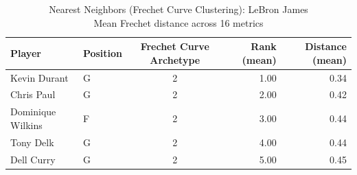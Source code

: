 \begin{table}[t]
\caption*{
{\fontsize{20}{25} Nearest Neighbors (Frechet Curve Clustering): LeBron James\fontsize{12}{15}\selectfont } \\ 
{\fontsize{14}{17}\selectfont  Mean Frechet distance across 16 metrics\fontsize{12}{15}\selectfont }
} 
\fontsize{12.0pt}{14.0pt}\selectfont
\begin{tabular*}{\linewidth}{@{\extracolsep{\fill}}llcrr}
\toprule
Player & Position & Frechet Curve Archetype & Rank (mean) & Distance (mean) \\ 
\midrule\addlinespace[2.5pt]
Kevin Durant & G & 2 & 1.00 & 0.34 \\ 
Chris Paul & G & 2 & 2.00 & 0.42 \\ 
Dominique Wilkins & F & 2 & 3.00 & 0.44 \\ 
Tony Delk & G & 2 & 4.00 & 0.44 \\ 
Dell Curry & G & 2 & 5.00 & 0.45 \\ 
\bottomrule
\end{tabular*}
\end{table}

